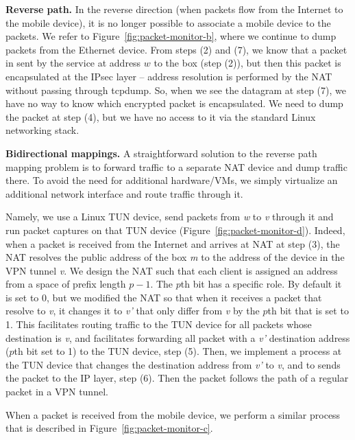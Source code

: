 \noindent \textbf{Reverse path.} In the reverse direction (when packets flow from the
Internet to the mobile device), it is no longer possible to associate a
mobile device to the packets. We refer to 
Figure~\ref{fig:packet-monitor-b}, where we continue to dump packets from 
the Ethernet device. From
steps (2) and (7), we know that a packet in sent by the service at address $w$ to
the \platname{} box (step (2)), but then this packet is encapsulated
at the IPsec layer -- address resolution is performed by the NAT
without passing through tcpdump. So, when we see the datagram at step (7), we have no
way to know which encrypted packet is encapsulated. We need to dump
the packet at step (4), but we have no access to it via the standard Linux networking stack. 

\noindent \textbf{Bidirectional mappings.} A straightforward solution to 
the reverse path mapping problem is to forward traffic to a separate NAT 
device and dump traffic there. To avoid the need for additional hardware/VMs,
we simply virtualize an additional network interface and route traffic through it. 

Namely, we use a Linux TUN device, send packets from \emph{w} to \emph{v} through 
it and run packet captures on that TUN device (Figure~\ref{fig:packet-monitor-d}). 
Indeed, when a packet is
received from the Internet and arrives at NAT at step
(3), the NAT resolves the public address of the
\platname{} box \emph{m} to the address of the device in the VPN
tunnel \emph{v}. We design the NAT such that each client is assigned an 
address from a space of prefix length $p-1$. The $p$th bit has a
specific role. By default it is set to 0, but we modified the NAT so
that when it receives a packet that resolve to \emph{v}, it changes it
to \emph{v'} that only differ from \emph{v} by the $p$th bit that is
set to 1. This facilitates routing traffic to the TUN device for all
packets whose destination is \emph{v}, and facilitates forwarding  
all packet with a \emph{v'} destination address ($p$th bit set
to 1) to the TUN device, step (5). Then, we implement a process at the
TUN device that changes the destination address
from \emph{v'} to \emph{v}, and to sends the packet to the IP
layer, step (6). Then the packet follows the path of a regular packet
in a VPN tunnel. 

When a packet is received from the mobile device, we perform a similar
process that is described in Figure~\ref{fig:packet-monitor-c}. 


